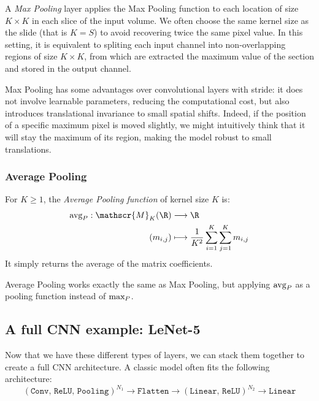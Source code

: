 A \emph{Max Pooling} layer applies the Max Pooling function to each location of size $K\times K$ in each slice of the input volume. We often choose the same kernel size as the slide (that is $K=S$) to avoid recovering twice the same pixel value. In this setting, it is equivalent to spliting each input channel into non-overlapping regions of size $K\times K$, from which are extracted the maximum value of the section and stored in the output channel.

Max Pooling has some advantages over convolutional layers with stride: it does not involve learnable parameters, reducing the computational cost, but also introduces translational invariance to small spatial shifts. Indeed, if the position of a specific maximum pixel is moved slightly, we might intuitively think that it will stay the maximum of its region, making the model robust to small translations.

\subsubsection{Average Pooling}
\begin{definition}
    For $K\geq 1$, the \emph{Average Pooling function} of kernel size $K$ is:
    \begin{equation*}
        \begin{aligned}
            \textnormal{avg}_P: \mathscr{M}_{K}(\R) &\longrightarrow \R\\
            (m_{i, j}) &\longmapsto \frac{1}{K^2}\sum_{i=1}^K \sum_{j=1}^K m_{i, j}
        \end{aligned}
    \end{equation*}
    It simply returns the average of the matrix coefficients.
\end{definition}

Average Pooling works exactly the same as Max Pooling, but applying $\textnormal{avg}_P$ as a pooling function instead of $\textnormal{max}_P$.

\subsection{A full CNN example: LeNet-5}
Now that we have these different types of layers, we can stack them together to create a full CNN architecture. A classic model often fits the following architecture:
\begin{equation*}
    (\texttt{Conv, ReLU, Pooling})^{N_1} \rightarrow \texttt{Flatten} \rightarrow (\texttt{Linear, ReLU})^{N_2} \rightarrow \texttt{Linear}
\end{equation*}


